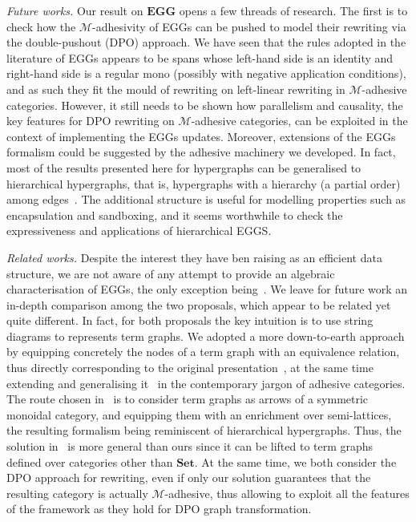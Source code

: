 \documentclass[a4paper,UKenglish,cleveref,pdftex,thm-restate,numberwithinsect]{lipics-v2021}
\newcommand{\Set}{\mathbf{Set}}
\newcommand{\eg}[0]{\mathbf{EGG}}
\begin{document}
\emph{Future works.}
Our result on $\eg$ opens a few threads of research. The first is to check how the $\mathcal{M}$-adhesivity 
of EGGs can be pushed to model their rewriting via the double-pushout (DPO) approach. We have seen that 
the rules adopted in the literature of EGGs appears to be spans whose left-hand side is an identity and 
right-hand side is a regular mono (possibly with negative application 
conditions), and as such they fit the mould of rewriting on left-linear rewriting in $\mathcal{M}$-adhesive categories. 
%
However, it still needs to be shown how parallelism and causality, the key features for DPO rewriting
on $\mathcal{M}$-adhesive categories, can be exploited in the context of implementing the 
EGGs updates. 
Moreover, extensions of the EGGs formalism could be suggested by the adhesive 
machinery we developed.
In fact, most of the results
presented here for hypergraphs can be generalised to hierarchical hypergraphs, that is, 
hypergraphs with a hierarchy (a partial order) among 
edges~\cite{ghicaZan,CastelnovoGM24}.
The additional structure is useful for modelling properties such as encapsulation and sandboxing,
and it seems worthwhile to check the expressiveness and applications of hierarchical EGGS.

\emph{Related works.}
Despite the interest they have ben raising as an efficient data structure, we are not aware of any attempt to provide an 
algebraic characterisation of EGGs, the only exception being~\cite{ghica}. We leave for future work an in-depth comparison 
among the two proposals, which appear to be related yet quite different.
%
In fact, for both proposals the key intuition is  to use string diagrams to represents term graphs. We adopted a
more down-to-earth approach by equipping
concretely the nodes of a term graph with an equivalence relation, thus directly corresponding to the original presentation~\cite{DetlefsNS05},
at the same time extending and generalising it~\cite{concur2006} in the contemporary jargon of adhesive categories.
The route chosen in~\cite{ghica} is to consider term graphs as arrows of a symmetric monoidal category,
and equipping them with an enrichment over semi-lattices, the resulting formalism being reminiscent of hierarchical hypergraphs.
Thus, the solution in~\cite{ghica}  is  more general than ours since it can be lifted to term graphs defined over categories other than
$\Set$.
%
At the same time, we both consider the DPO approach for rewriting, even if only our solution guarantees that the resulting category
is actually $\mathcal{M}$-adhesive, thus allowing to exploit all the features of the framework
as they hold for DPO graph transformation.
\end{document}
